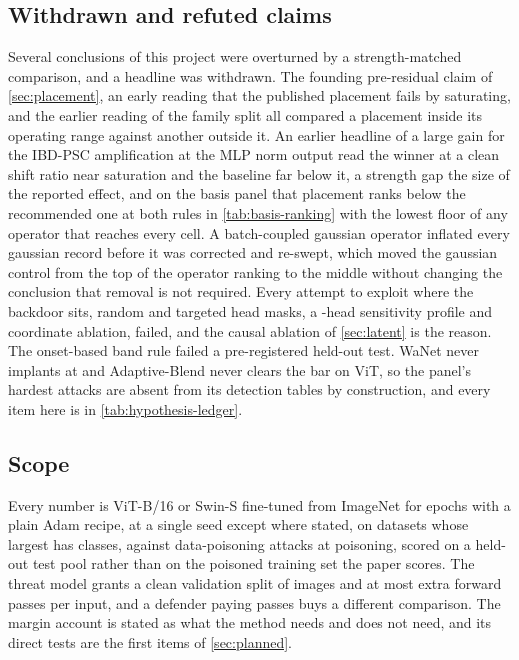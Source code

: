 \documentclass[../main.tex]{subfiles}
\begin{document}


\subsection{Withdrawn and refuted claims}

Several conclusions of this project were overturned by a strength-matched comparison, and a headline was withdrawn. The founding pre-residual claim of \cref{sec:placement}, an early reading that the published placement fails by saturating, and the earlier reading of the family split all compared a placement inside its operating range against another outside it. An earlier headline of a large gain for the IBD-PSC amplification at the MLP norm output read the winner at a clean shift ratio near saturation and the baseline far below it, a strength gap the size of the reported effect, and on the basis panel that placement ranks below the recommended one at both rules in \cref{tab:basis-ranking} with the lowest floor of any operator that reaches every cell. A batch-coupled gaussian operator inflated every gaussian record before it was corrected and re-swept, which moved the gaussian control from the top of the operator ranking to the middle without changing the conclusion that removal is not required. Every attempt to exploit where the backdoor sits, random and targeted head masks, a \VitTotalHeads{}-head sensitivity profile and coordinate ablation, failed, and the causal ablation of \cref{sec:latent} is the reason. The onset-based band rule failed a pre-registered held-out test. WaNet never implants at \PanelRateLow{} and Adaptive-Blend never clears the bar on ViT, so the panel's hardest attacks are absent from its detection tables by construction, and every item here is in \cref{tab:hypothesis-ledger}.

\subsection{Scope}

Every number is ViT-B/16 or Swin-S fine-tuned from ImageNet for \TrainingEpochs{} epochs with a plain Adam recipe, at a single seed except where stated, on \PanelDatasetsDeclared{} datasets whose largest has \ClassesTiny{} classes, against data-poisoning attacks at \PanelRates{} poisoning, scored on a held-out test pool rather than on the poisoned training set the paper scores. The threat model grants a clean validation split of \HeldoutSize{} images and at most \ForwardPasses{} extra forward passes per input, and a defender paying \CdLPasses{} passes buys a different comparison. The margin account is stated as what the method needs and does not need, and its direct tests are the first items of \cref{sec:planned}.
\end{document}
